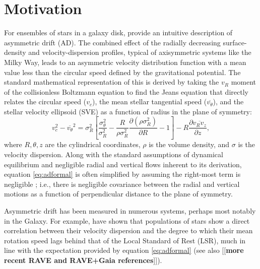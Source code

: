 \documentclass[apj,iop,revtex4,numberedappendix]{emulateapj}
\newcommand{\comment}[2][todo]{{\color{#1}[[{\bf #2}]]}}
\begin{document}

\section{ Motivation }
\label{sec:intro}

For ensembles of stars in a galaxy disk, \citet[][Section
4.4.3]{2008gady.book.....B} provide an intuitive description of
asymmetric drift (AD).  The combined effect of the radially decreasing
surface-density and velocity-dispersion profiles, typical of
axisymmetric systems like the Milky Way, leads to an asymmetric velocity
distribution function with a mean value less than the circular speed
defined by the gravitational potential.  The standard mathematical
representation of this is derived by taking the $v_R$ moment of the
collisionless Boltzmann equation to find the Jeans equation
\citep{Jeans1919} that directly relates the circular speed ($v_c$), the
mean stellar tangential speed ($\overline{v_\theta}$), and the stellar
velocity ellipsoid (SVE) as a function of radius in the plane of
symmetry:
%
\begin{equation}
%
v_c^2 - \overline{v_\theta}^2 = \sigma_R^2\left[
\frac{\sigma_\theta^2}{\sigma_R^2} -
\frac{R}{\rho\sigma_R^2}\frac{\partial(\rho\sigma_R^2)}{\partial R} -
1\right] - R\frac{\partial\overline{v_R v_z}}{\partial z},
%
\label{eq:adformal}
%
\end{equation}
%
where $R,\theta,z$ are the cylindrical coordinates, $\rho$ is the volume
density, and $\sigma$ is the velocity dispersion.  Along with the
standard assumptions of dynamical equilibrium and negligible radial and
vertical flows inherent to its derivation, equation \ref{eq:adformal} is
often simplified by assuming the right-most term is negligible
\citep[cf.][]{1991ApJ...368...79A}; i.e., there is negligible covariance
between the radial and vertical motions as a function of perpendicular
distance to the plane of symmetry.

Asymmetric drift has been measured in numerous systems, perhaps most
notably in the Galaxy.  For example, \citet{1998MNRAS.298..387D} have
shown that populations of stars show a direct correlation between their
velocity dispersion and the degree to which their mean rotation speed
lags behind that of the Local Standard of Rest (LSR), much in line with
the expectation provided by equation \ref{eq:adformal} (see also
\comment{more recent RAVE and RAVE+Gaia references}).
\end{document}
